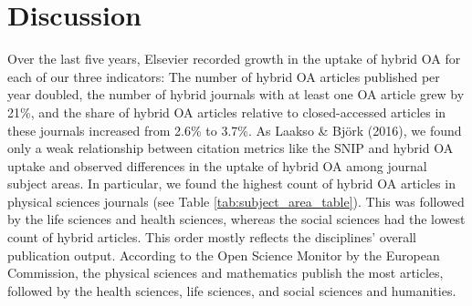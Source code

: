 \documentclass[a4paper,man,floatsintext,longtable,noextraspace,12pt]{apa6}
\begin{document}
\hypertarget{discussion}{%
\section{Discussion}\label{discussion}}

Over the last five years, Elsevier recorded growth in the uptake of
hybrid OA for each of our three indicators: The number of hybrid OA
articles published per year doubled, the number of hybrid journals with
at least one OA article grew by 21\%, and the share of hybrid OA
articles relative to closed-accessed articles in these journals
increased from 2.6\% to 3.7\%. As Laakso \& Björk (2016), we found only
a weak relationship between citation metrics like the SNIP and hybrid OA
uptake and observed differences in the uptake of hybrid OA among journal
subject areas. In particular, we found the highest count of hybrid OA
articles in physical sciences journals (see Table
\ref{tab:subject_area_table}). This was followed by the life sciences
and health sciences, whereas the social sciences had the lowest count of
hybrid articles. This order mostly reflects the disciplines' overall
publication output. According to the Open Science Monitor by the
European Commission, the physical sciences and mathematics publish the
most articles, followed by the health sciences, life sciences, and
social sciences and humanities.
\end{document}
